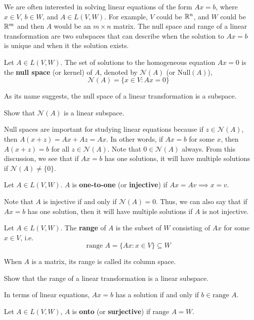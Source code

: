 We are often interested in solving linear equations of the form $A x =
b$, where $x \in V$, $b \in W$, and $A \in L(V,W)$. For example, $V$
could be $\mathbb{R}^n$, and $W$ could be $\mathbb{R}^m$ and then $A$ would be an $m
\times n$ matrix. The null space and range of a linear transformation
are two subspaces that can describe when the solution to $Ax=b$ is
unique and when it the solution exists.

\begin{definition}
  Let $A \in L(V,W)$. The set of solutions to the homogeneous
  equation $Ax = 0$ is the \textbf{null space} (or kernel) of
  $A$, denoted by $\mathcal{N}(A)$ (or $\mathrm{Null}(A)$),
  \[ \mathcal{N}(A) = \{x \in V: Ax = 0 \} \]
\end{definition}
As its name suggests, the null space of a linear transformation is a
subspace.
\begin{exercise}
  Show that $\mathcal{N}(A)$ is a linear subspace.
\end{exercise}
Null spaces are important for studying linear equations because if $z
\in \mathcal{N}(A)$, then $A (x + z) = Ax + A z = Ax$. In other words,
if $Ax = b$ for some $x$, then $A(x+z) = b$ for all $z \in
\mathcal{N}(A)$. Note that $0 \in \mathcal{N}(A)$ always. From this
discussion, we see that if $A x = b$ has one solutions, it will have
multiple solutions if $\mathcal{N}(A) \neq \{0 \}$.
\begin{definition}
  Let $A \in L(V,W)$. $A$ is \textbf{one-to-one} (or
  \textbf{injective}) if $Ax = A v \implies x = v$.
\end{definition}
Note that $A$ is injective if and only if $\mathcal{N}(A) = 0$. Thus,
we can also say that if $A x = b$ has one solution, then it will have
multiple solutions if $A$ is not injective.

\begin{definition}
  Let $A \in L(V,W)$. The \textbf{range} of $A$ is the subset of $W$
  consisting of $A x$ for some $x \in V$, i.e.
  \[ \text{range } A = \{ Ax: x \in V \} \subseteq W \]
\end{definition}
When $A$ is a matrix, its range is called its column space. 
\begin{exercise}
  Show that the range of a linear transformation is a linear subspace.
\end{exercise}
In terms of linear equations, $Ax = b$ has a solution if and only if
$b \in \text{range } A$. 
\begin{definition}
  Let $A \in L(V,W)$, $A$ is \textbf{onto} (or \textbf{surjective}) if
  $\text{range } A = W$.
\end{definition}

